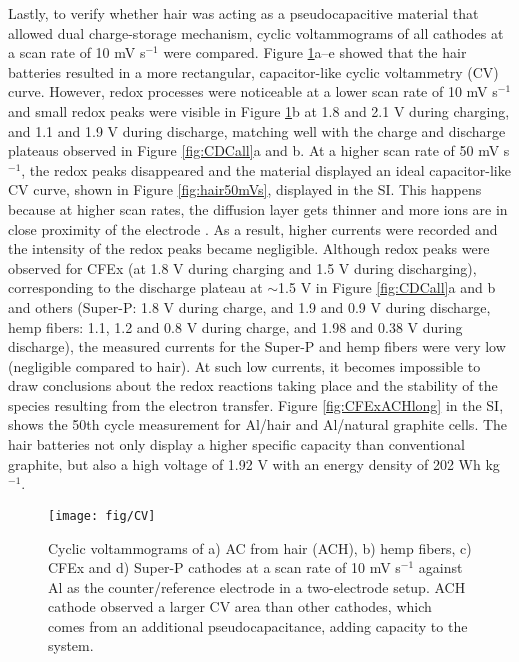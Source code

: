 \documentclass{article}
\begin{document}
Lastly, to verify whether hair was acting as a pseudocapacitive material that allowed dual charge-storage mechanism, cyclic voltammograms of all cathodes at a scan rate of 10 mV s$^{-1}$ were compared. Figure \ref{fig:CV}a--e showed that the hair batteries resulted in a more rectangular, capacitor-like cyclic voltammetry (CV) curve. However, redox processes were noticeable at a lower scan rate of 10 mV s$^{-1}$ and small redox peaks were visible in Figure \ref{fig:CV}b at 1.8 and 2.1 V during charging, and 1.1 and 1.9 V during discharge, matching well with the charge and discharge plateaus observed in Figure \ref{fig:CDCall}a and b. At a higher scan rate of 50 mV s$^{-1}$, the redox peaks disappeared and the material displayed an ideal capacitor-like CV curve, shown in Figure \ref{fig:hair50mVs}, displayed in the SI. This happens because at higher scan rates, the diffusion layer gets thinner and more ions are in close proximity of the electrode \cite{guan_capacitive_2016, dupont_separating_2015}. As a result, higher currents were recorded and the intensity of the redox peaks became negligible. Although redox peaks were observed for CFEx (at 1.8 V during charging and 1.5 V during discharging), corresponding to the discharge plateau at $\sim$1.5 V in Figure \ref{fig:CDCall}a and b and others (Super-P: 1.8 V during charge, and 1.9 and 0.9 V during discharge, hemp fibers: 1.1, 1.2 and 0.8 V during charge, and 1.98 and 0.38 V during discharge), the measured currents for the Super-P and hemp fibers were very low (negligible compared to hair). At such low currents, it becomes impossible to draw conclusions about the redox reactions taking place and the stability of the species resulting from the electron transfer. Figure \ref{fig:CFExACHlong} in the SI, shows the 50th cycle measurement for Al/hair and Al/natural graphite cells. The hair batteries not only display a higher specific capacity than conventional graphite, but also a high voltage of 1.92 V with an energy density of 202 Wh kg$^{-1}$.

\begin{figure}%
  \centering
  \texttt{[image: fig/CV]}
    \caption{Cyclic voltammograms of a) AC from hair (ACH), b) hemp fibers, c) CFEx and d) Super-P cathodes at a scan rate of 10 mV s$^{-1}$ against Al as the counter/reference electrode in a two-electrode setup. ACH cathode observed a larger CV area than other cathodes, which comes from an additional pseudocapacitance, adding capacity to the system.}
  \label{fig:CV}
\end{figure}
\end{document}
